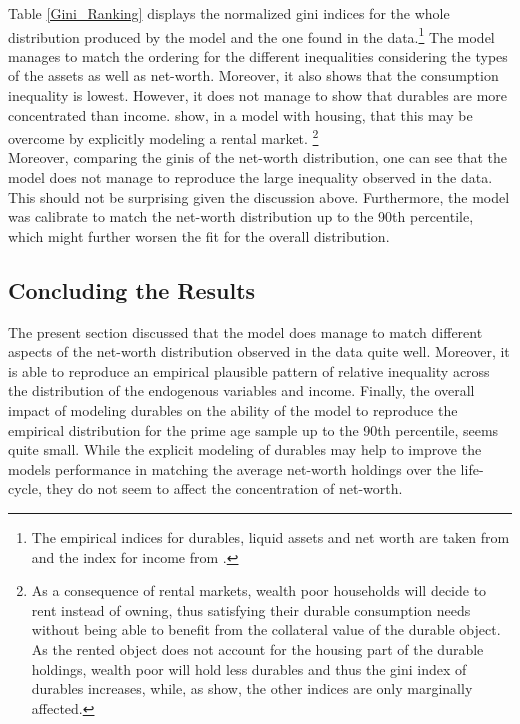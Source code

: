 \documentclass[a4paper,12pt,legno]{article}
\begin{document}
Table \ref{Gini_Ranking} displays the normalized \citep{chen1982} gini indices for the whole distribution produced by the model and the one found in the data.\footnote{The empirical indices for durables, liquid assets and net worth are taken from \cite{hintermaier2010} and the index for income from \cite{hintermaier2011}.} The model manages to match the ordering for the different inequalities considering the types of the assets as well as net-worth. Moreover, it also shows that the consumption inequality is lowest. However, it does not manage to show that durables are more concentrated than income. \cite{diaz2010} show, in a model with housing, that this may be overcome by explicitly modeling a rental market. \footnote{As a consequence of rental markets, wealth poor households will decide to rent instead of owning, thus satisfying their durable consumption needs without being able to benefit from the collateral value of the durable object. As the rented object does not account for the housing part of the durable holdings, wealth poor will hold less durables and thus the gini index of durables increases, while, as \cite{diaz2010} show, the other indices are only marginally affected.} \\
Moreover, comparing the ginis of the net-worth distribution, one can see that the model does not manage to reproduce the large inequality observed in the data. This should not be surprising given the discussion above. Furthermore, the model was calibrate to match the net-worth distribution up to the 90th percentile, which might further worsen the fit for the overall distribution.  

\subsection{Concluding the Results}
The present section discussed that the model does manage to match different aspects of the net-worth distribution observed in the data quite well. Moreover, it is able to reproduce an empirical plausible pattern of relative inequality across the distribution of the endogenous variables and income. Finally, the overall impact of modeling durables on the ability of the model to reproduce the empirical distribution for the prime age sample up to the 90th percentile, seems quite small. While the explicit modeling of durables may help to improve the models performance in matching the average net-worth holdings over the life-cycle, they do not seem to affect the concentration of net-worth.
\end{document}
